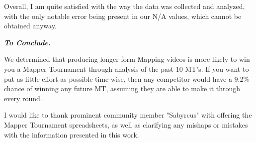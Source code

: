 \documentclass[letterpaper,twocolumn,amsmath,amssymb,prl,nolongbibliography,url,reprint]{revtex4-2}
\begin{document}
Overall, I am quite satisfied with the way the data was collected and analyzed, with the only notable error being present in our N/A values, which cannot be obtained anyway.

\textbf{\emph{To Conclude.}}

We determined that producing longer form Mapping videos is more likely to win you a Mapper Tournament through analysis of the past 10 MT's. If you want to put as little effort as possible time-wise, then any competitor would have a 9.2\% chance of winning any future MT, assuming they are able to make it through every round.

I would like to thank prominent community member "Sabyrcus" with offering the Mapper Tournament spreadsheets, as well as clarifying any mishaps or mistakes with the information presented in this work. 
\end{document}
